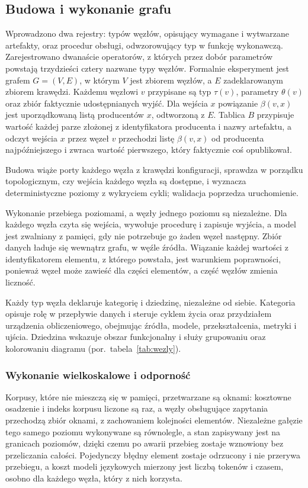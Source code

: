 \subsection{Budowa i wykonanie grafu}
Wprowadzono dwa rejestry: typów węzłów, opisujący wymagane i wytwarzane artefakty, oraz procedur
obsługi, odwzorowujący typ w funkcję wykonawczą. Zarejestrowano dwanaście operatorów, z których
przez dobór parametrów powstają trzydzieści cztery nazwane typy węzłów. Formalnie eksperyment jest
grafem $G = (V, E)$, w którym $V$ jest zbiorem węzłów, a $E$ zadeklarowanym zbiorem krawędzi.
Każdemu węzłowi $v$ przypisane są typ $\tau(v)$, parametry $\theta(v)$ oraz zbiór faktycznie
udostępnianych wyjść. Dla wejścia $x$ powiązanie $\beta(v, x)$ jest uporządkowaną listą
producentów $x$, odtworzoną z $E$. Tablica $B$ przypisuje wartość każdej parze złożonej z
identyfikatora producenta i nazwy artefaktu, a odczyt wejścia $x$ przez węzeł $v$ przechodzi listę
$\beta(v, x)$ od producenta najpóźniejszego i zwraca wartość pierwszego, który faktycznie coś
opublikował.

Budowa wiąże porty każdego węzła z krawędzi konfiguracji, sprawdza w porządku topologicznym, czy
wejścia każdego węzła są dostępne, i wyznacza deterministyczne poziomy z wykryciem cykli;
walidacja poprzedza uruchomienie.

Wykonanie przebiega poziomami, a węzły jednego poziomu są niezależne. Dla każdego węzła czyta się
wejścia, wywołuje procedurę i zapisuje wyjścia, a model jest zwalniany z pamięci, gdy nie
potrzebuje go żaden węzeł następny. Zbiór danych ładuje się wewnątrz grafu, w węźle źródła. 
Wiązanie każdej wartości z identyfikatorem elementu, z którego powstała, jest warunkiem poprawności, ponieważ węzeł może
zawieść dla części elementów, a część węzłów zmienia liczność.

Każdy typ węzła deklaruje kategorię i dziedzinę, niezależne od siebie. Kategoria opisuje rolę w
przepływie danych i steruje cyklem życia oraz przydziałem urządzenia obliczeniowego, obejmując
źródła, modele, przekształcenia, metryki i ujścia. Dziedzina wskazuje obszar funkcjonalny i służy
grupowaniu oraz kolorowaniu diagramu (por.\ tabela~\ref{tab:wezly}).

\subsubsection{Wykonanie wielkoskalowe i odporność}
Korpusy, które nie mieszczą się w pamięci, przetwarzane są oknami: kosztowne osadzenie i indeks
korpusu liczone są raz, a węzły obsługujące zapytania przechodzą zbiór oknami, z zachowaniem
kolejności elementów. Niezależne gałęzie tego samego poziomu wykonywane są równolegle, a stan
zapisywany jest na granicach poziomów, dzięki czemu po awarii przebieg zostaje wznowiony bez
przeliczania całości. Pojedynczy błędny element zostaje odrzucony i nie przerywa przebiegu, a
koszt modeli językowych mierzony jest liczbą tokenów i czasem, osobno dla każdego węzła, który z
nich korzysta.

